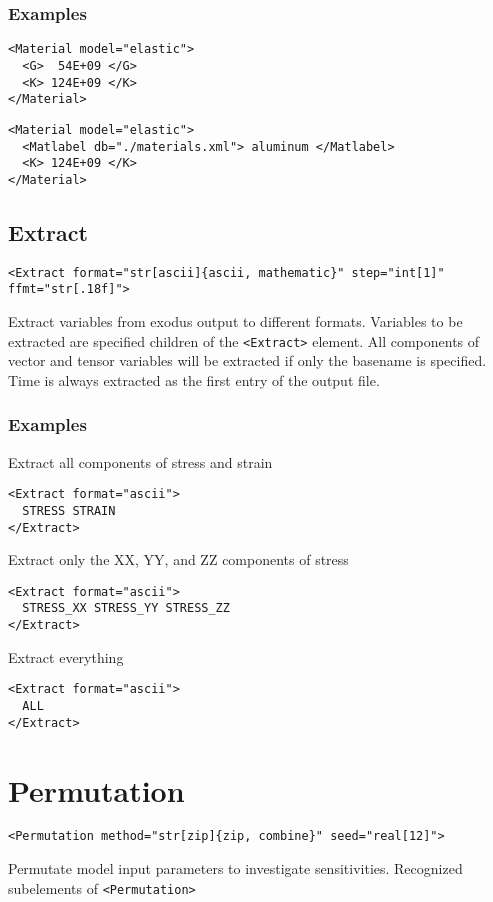 \documentclass[11pt]{report}
\newcommand{\tag}[1]{\texttt{<#1>}}
\begin{document}
\subsubsection{Examples}
\begin{verbatim}
<Material model="elastic">
  <G>  54E+09 </G>
  <K> 124E+09 </K>
</Material>
\end{verbatim}

\begin{verbatim}
<Material model="elastic">
  <Matlabel db="./materials.xml"> aluminum </Matlabel>
  <K> 124E+09 </K>
</Material>
\end{verbatim}

\subsection{Extract}
\begin{verbatim}
<Extract format="str[ascii]{ascii, mathematic}" step="int[1]" ffmt="str[.18f]">
\end{verbatim}
%
Extract variables from exodus output to different formats. Variables to be
extracted are specified children of the \tag{Extract} element. All components
of vector and tensor variables will be extracted if only the basename is
specified.  Time is always extracted as the first entry of the output file.

\subsubsection{Examples}
Extract all components of stress and strain
%
\begin{verbatim}
<Extract format="ascii">
  STRESS STRAIN
</Extract>
\end{verbatim}

Extract only the XX, YY, and ZZ components of stress
%
\begin{verbatim}
<Extract format="ascii">
  STRESS_XX STRESS_YY STRESS_ZZ
</Extract>
\end{verbatim}

Extract everything
\begin{verbatim}
<Extract format="ascii">
  ALL
</Extract>
\end{verbatim}

\section{Permutation}
\begin{verbatim}
<Permutation method="str[zip]{zip, combine}" seed="real[12]">
\end{verbatim}
%
Permutate model input parameters to investigate sensitivities. Recognized
subelements of \tag{Permutation}
\end{document}
